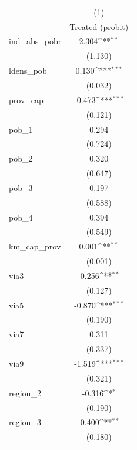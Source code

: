 {
\def\sym#1{\ifmmode^{#1}\else\(^{#1}\)\fi}
\begin{tabular}{l*{1}{c}}
\toprule
            &\multicolumn{1}{c}{(1)}\\
            &\multicolumn{1}{c}{Treated (probit)}\\
\midrule
ind\_abs\_pobr&       2.304\sym{**} \\
            &     (1.130)         \\
\addlinespace
ldens\_pob   &       0.130\sym{***}\\
            &     (0.032)         \\
\addlinespace
prov\_cap    &      -0.473\sym{***}\\
            &     (0.121)         \\
\addlinespace
pob\_1       &       0.294         \\
            &     (0.724)         \\
\addlinespace
pob\_2       &       0.320         \\
            &     (0.647)         \\
\addlinespace
pob\_3       &       0.197         \\
            &     (0.588)         \\
\addlinespace
pob\_4       &       0.394         \\
            &     (0.549)         \\
\addlinespace
km\_cap\_prov &       0.001\sym{**} \\
            &     (0.001)         \\
\addlinespace
via3        &      -0.256\sym{**} \\
            &     (0.127)         \\
\addlinespace
via5        &      -0.870\sym{***}\\
            &     (0.190)         \\
\addlinespace
via7        &       0.311         \\
            &     (0.337)         \\
\addlinespace
via9        &      -1.519\sym{***}\\
            &     (0.321)         \\
\addlinespace
region\_2    &      -0.316\sym{*}  \\
            &     (0.190)         \\
\addlinespace
region\_3    &      -0.400\sym{**} \\
            &     (0.180)         \\

\end{tabular}}
